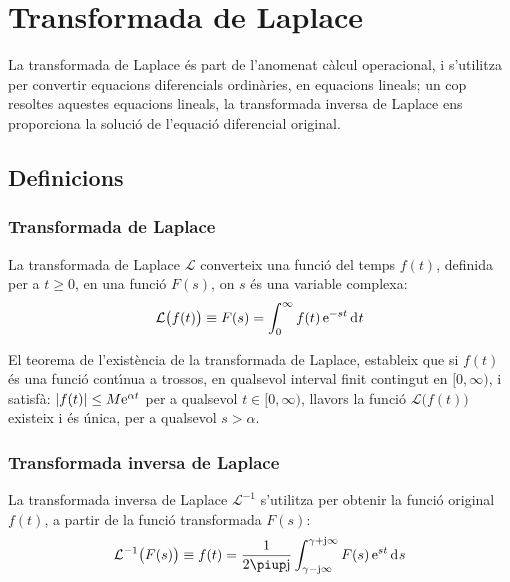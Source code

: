 \chapter{Transformada de
Laplace}\label{sec:laplace}

La transformada de Laplace \'{e}s part de l'anomenat c\`{a}lcul operacional,
i s'utilitza per convertir equacions diferencials ordin\`{a}ries, en
equacions lineals; un cop resoltes aquestes equacions lineals, la
transformada inversa de Laplace ens proporciona la soluci\'{o} de
l'equaci\'{o} diferencial original.

\section{Definicions}

\subsection{Transformada de Laplace}

La transformada de Laplace $\mathcal{L}$  converteix una funci\'{o} del
temps $f(t)$, definida per a $t\geq 0$, en una funci\'{o} $F(s)$, on $s$
\'{e}s una variable complexa:
\begin{equation}
    \mathcal{L}\bigl(f(t)\bigr) \equiv F(s) = \int_0^\infty f(t) \,\eu^{-s t} \diff
    t \label{eq:transf_laplace}
\end{equation}

El teorema de l'exist\`{e}ncia de la transformada de Laplace, estableix
que si $f(t)$ \'{e}s una funci\'{o} cont\'{\i}nua a trossos, en qualsevol
interval finit contingut en $[0,\infty)$, i satisf\`{a}: $|f(t)| \leq M
\mathrm{e}^{\alpha t}$ per a qualsevol $t \in [0,\infty)$, llavors la
funci\'{o} $\mathcal{L}\bigl(f(t)\bigr)$ existeix i \'{e}s \'{u}nica, per a
qualsevol $s > \alpha$.

\subsection{Transformada inversa de Laplace}

La transformada inversa de Laplace $\mathcal{L}^{-1}$ s'utilitza per
obtenir la funci\'{o} original $f(t)$, a partir de la funci\'{o}
transformada $F(s)$:
\begin{equation}
    \mathcal{L}^{-1}\bigl(F(s)\bigr) \equiv f(t) = \frac{1}{2 \piup \ju }
    \int_{\gamma-\ju \infty}^{\gamma+\ju \infty} F(s)\, \eu^{s t} \diff
    s \label{eq:transf_inv_laplace}
\end{equation}

